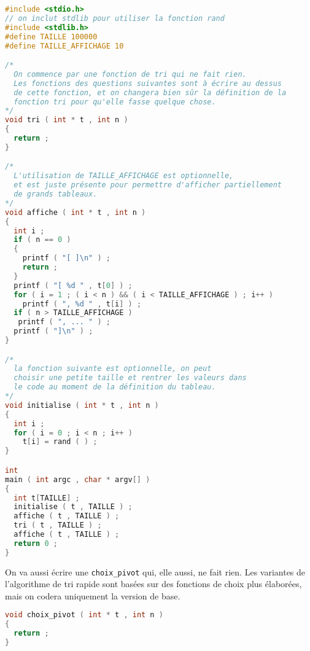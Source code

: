 \begin{solutioncachee}
  \begin{lstlisting}[language=C]
#include <stdio.h>
// on inclut stdlib pour utiliser la fonction rand
#include <stdlib.h>
#define TAILLE 100000
#define TAILLE_AFFICHAGE 10

/*
  On commence par une fonction de tri qui ne fait rien.
  Les fonctions des questions suivantes sont à écrire au dessus
  de cette fonction, et on changera bien sûr la définition de la 
  fonction tri pour qu'elle fasse quelque chose.
*/
void tri ( int * t , int n )
{
  return ;
}  

/*
  L'utilisation de TAILLE_AFFICHAGE est optionnelle,
  et est juste présente pour permettre d'afficher partiellement 
  de grands tableaux.
*/
void affiche ( int * t , int n )
{
  int i ;
  if ( n == 0 )
  {
    printf ( "[ ]\n" ) ;
    return ;
  }
  printf ( "[ %d " , t[0] ) ;
  for ( i = 1 ; ( i < n ) && ( i < TAILLE_AFFICHAGE ) ; i++ )
    printf ( ", %d " , t[i] ) ;
  if ( n > TAILLE_AFFICHAGE )
   printf ( ", ... " ) ;
  printf ( "]\n" ) ;
}

/*
  la fonction suivante est optionnelle, on peut
  choisir une petite taille et rentrer les valeurs dans
  le code au moment de la définition du tableau.
*/
void initialise ( int * t , int n )
{
  int i ;
  for ( i = 0 ; i < n ; i++ )
    t[i] = rand ( ) ;
}

int
main ( int argc , char * argv[] )
{
  int t[TAILLE] ;
  initialise ( t , TAILLE ) ;
  affiche ( t , TAILLE ) ;
  tri ( t , TAILLE ) ;
  affiche ( t , TAILLE ) ;
  return 0 ;
}

  \end{lstlisting}
\end{solutioncachee}



\question On va aussi écrire une \texttt{choix\_pivot} qui, elle
aussi, ne fait rien. Les variantes de l'algorithme de tri rapide sont
basées sur des fonctions de choix plus élaborées, mais on codera
uniquement la version de base.

\begin{solutioncachee}
  \begin{lstlisting}[language=C]
void choix_pivot ( int * t , int n )
{
  return ;
}  
  \end{lstlisting}
\end{solutioncachee}

